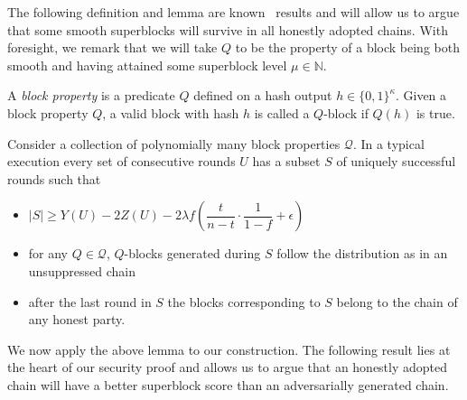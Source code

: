 The following definition and lemma are known~\cite{dionyziz} results and will
allow us to argue that some smooth superblocks will survive in all honestly
adopted chains. With foresight, we remark that we will take $Q$ to be the
property of a block being both smooth and having attained some superblock level
$\mu \in \mathbb{N}$.

\begin{definition}
    A \emph{block property} is a predicate $Q$ defined on a hash output $h \in \{ 0, 1 \}^\kappa$. Given a block property $Q$, a valid block with hash $h$ is called a $Q$-block if $Q(h)$ is true.
\end{definition}

\begin{lemma}[Unsuppressibility]
    Consider a collection of polynomially many block properties $\mathcal{Q}$. In a typical execution every set of consecutive rounds $U$ has a subset $S$ of uniquely successful rounds such that
    \begin{itemize}
        \item $\lvert S \rvert \geq Y(U) - 2Z(U) - 2 \lambda f (\dfrac{t}{n-t} \cdot \dfrac{1}{1-f} + \epsilon)$
        \item for any $Q \in \mathcal{Q}$, $Q$-blocks generated during $S$ follow the distribution as in an unsuppressed chain
        \item after the last round in $S$ the blocks corresponding to $S$ belong
        to the chain of any honest party.
    \end{itemize}
\end{lemma}

We now apply the above lemma to our construction. The following result lies at
the heart of our security proof and allows us to argue that an honestly adopted
chain will have a better superblock score than an adversarially generated chain.

